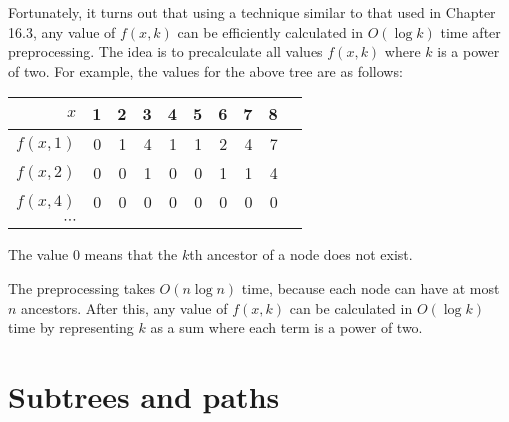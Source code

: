 Fortunately, it turns out that
using a technique similar to that
used in Chapter 16.3, any value of $f(x,k)$
can be efficiently calculated in $O(\log k)$ time
after preprocessing.
The idea is to precalculate all values $f(x,k)$
where $k$ is a power of two.
For example, the values for the above tree
are as follows:

\begin{center}
\begin{tabular}{r|rrrrrrrrr}
$x$ & 1 & 2 & 3 & 4 & 5 & 6 & 7 & 8 \\
\hline
$f(x,1)$ & 0 & 1 & 4 & 1 & 1 & 2 & 4 & 7 \\
$f(x,2)$ & 0 & 0 & 1 & 0 & 0 & 1 & 1 & 4 \\
$f(x,4)$ & 0 & 0 & 0 & 0 & 0 & 0 & 0 & 0 \\
$\cdots$ \\
\end{tabular}
\end{center}

The value $0$ means that the $k$th ancestor
of a node does not exist.

The preprocessing takes $O(n \log n)$ time,
because each node can have at most $n$ ancestors.
After this, any value of $f(x,k)$ can be calculated
in $O(\log k)$ time by representing $k$
as a sum where each term is a power of two.

\section{Subtrees and paths}


